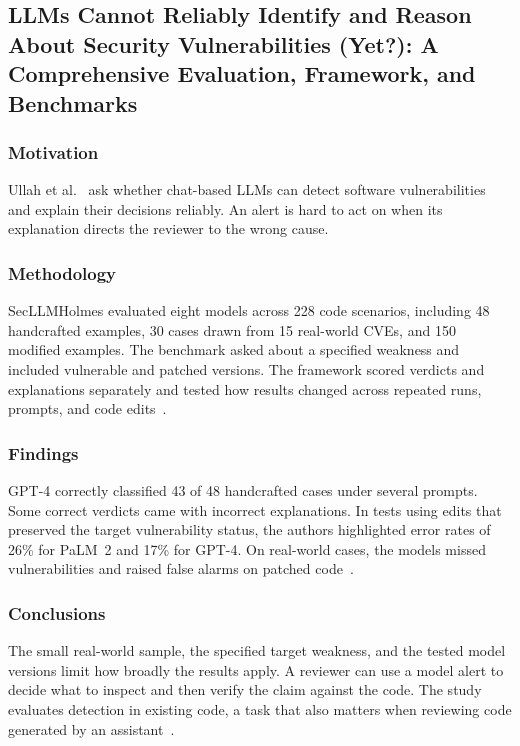 \subsection{LLMs Cannot Reliably Identify and Reason About Security Vulnerabilities (Yet?): A Comprehensive Evaluation, Framework, and Benchmarks}
\label{sec:vulnerability-detection}

\subsubsection{Motivation}
Ullah et al.~\cite{ullah2024secllmholmes} ask whether chat-based LLMs can detect software vulnerabilities and explain their decisions reliably. An alert is hard to act on when its explanation directs the reviewer to the wrong cause.

\subsubsection{Methodology}
SecLLMHolmes evaluated eight models across 228 code scenarios, including 48 handcrafted examples, 30 cases drawn from 15 real-world CVEs, and 150 modified examples. The benchmark asked about a specified weakness and included vulnerable and patched versions. The framework scored verdicts and explanations separately and tested how results changed across repeated runs, prompts, and code edits~\cite[Secs.~3--4]{ullah2024secllmholmes}.

\subsubsection{Findings}
GPT-4 correctly classified 43 of 48 handcrafted cases under several prompts. Some correct verdicts came with incorrect explanations. In tests using edits that preserved the target vulnerability status, the authors highlighted error rates of 26\% for PaLM~2 and 17\% for GPT-4. On real-world cases, the models missed vulnerabilities and raised false alarms on patched code~\cite[Secs.~4.3--4.8]{ullah2024secllmholmes}.

\subsubsection{Conclusions}
The small real-world sample, the specified target weakness, and the tested model versions limit how broadly the results apply. A reviewer can use a model alert to decide what to inspect and then verify the claim against the code. The study evaluates detection in existing code, a task that also matters when reviewing code generated by an assistant~\cite{ullah2024secllmholmes}.
